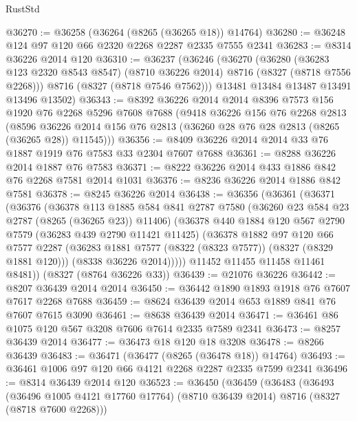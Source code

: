 \begin{lexlean}{RustStd}
\begin{coremodule}
{\begin{coremodule}
{{{{{{{{{{{{{{{{{{{{{{{{{{{{{{{{{{{{{{{{{{{{{{{{{{{{{{@36270 := @36258 (@36264 (@8265 (@36265 @18)) @14764)
@36280 := @36248 @124 @97 @120 @66 @2320 @2268 @2287 @2335 @7555 @2341
@36283 := @8314 @36226 @2014 @120
@36310 := @36237
    (@36246
      (@36270
        (@36280
          (@36283 @123 @2320 @8543 @8547)
          (@8710 @36226 @2014)
          @8716
          (@8327 (@8718 @7556 @2268)))
        @8716
        (@8327 (@8718 @7546 @7562)))
      @13481
      @13484
      @13487
      @13491
      @13496
      @13502)
@36343 := @8392
    @36226
    @2014
    @2014
    @8396
    @7573
    @156
    @1920
    @76
    @2268
    @5296
    @7608
    @7688
    (@9418
      @36226
      @156
      @76
      @2268
      @2813
      (@8596 @36226 @2014 @156 @76 @2813 (@36260 @28 @76 @28 @2813 (@8265 (@36265 @28)) @11545)))
@36356 := @8409 @36226 @2014 @2014 @33 @76 @1887 @1919 @76 @7583 @33 @2304 @7607 @7688
@36361 := @8288 @36226 @2014 @1887 @76 @7583
@36371 := @8222 @36226 @2014 @433 @1886 @842 @76 @2268 @7581 @2014 @1031
@36376 := @8236 @36226 @2014 @1886 @842 @7581
@36378 := @8245 @36226 @2014
@36438 := @36356
    (@36361
      (@36371
        (@36376
          (@36378
            @113
            @1885
            @584
            @841
            @2787
            @7580
            (@36260 @23 @584 @23 @2787 (@8265 (@36265 @23)) @11406)
            (@36378
              @440
              @1884
              @120
              @567
              @2790
              @7579
              (@36283 @439 @2790 @11421 @11425)
              (@36378
                @1882
                @97
                @120
                @66
                @7577
                @2287
                (@36283 @1881 @7577 (@8322 (@8323 @7577)) (@8327 (@8329 @1881 @120)))
                (@8338 @36226 @2014)))))
        @11452
        @11455
        @11458
        @11461
        @8481))
    (@8327 (@8764 @36226 @33))
@36439 := @21076 @36226
@36442 := @8207 @36439 @2014 @2014
@36450 := @36442 @1890 @1893 @1918 @76 @7607 @7617 @2268 @7688
@36459 := @8624 @36439 @2014 @653 @1889 @841 @76 @7607 @7615 @3090
@36461 := @8638 @36439 @2014
@36471 := @36461 @86 @1075 @120 @567 @3208 @7606 @7614 @2335 @7589 @2341
@36473 := @8257 @36439 @2014
@36477 := @36473 @18 @120 @18 @3208
@36478 := @8266 @36439
@36483 := @36471 (@36477 (@8265 (@36478 @18)) @14764)
@36493 := @36461 @1006 @97 @120 @66 @4121 @2268 @2287 @2335 @7599 @2341
@36496 := @8314 @36439 @2014 @120
@36523 := @36450
    (@36459
      (@36483
        (@36493
          (@36496 @1005 @4121 @17760 @17764)
          (@8710 @36439 @2014)
          @8716
          (@8327 (@8718 @7600 @2268)))
}}}}}}}}}}}}}}}}}}}}}}}}}}}}}}}}}}}}}}}}}}}}}}}}}}}}}}
\end{coremodule}}
\end{coremodule}
\end{lexlean}
